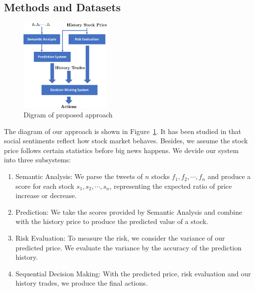 \documentclass[a4paper, 10pt, twocolumn]{article}
\begin{document}
\begin{spacing}{1}
    \section{Methods and Datasets}
    
    \begin{figure}
      \centering
      \includegraphics[width=0.4\textwidth]{diagram}
      \caption{Digram of proposed approach}
      \label{diagram_approach}
    \end{figure}
    
    The diagram of our approach is shown in Figure~\ref{diagram_approach}. It has been studied in \cite{social_relation_sentiment_analysis} that social sentiments reflect how stock market behaves. Besides, we assume the stock price follows certain statistics before big news happens. We devide our system into three subsystems:
    \begin{enumerate}
      \item Semantic Analysis: We parse the tweets of $n$ stocks $f_1, f_2, \cdots, f_n$ and produce a score for each stock $s_1, s_2, \cdots, s_n$, representing the expected ratio of price increase or decrease.
      \item Prediction: We take the scores provided by Semantic Analysis and combine with the history price to produce the predicted value of a stock.
      \item Risk Evaluation: To measure the risk, we consider the variance of our predicted price. We evaluate the variance by the accuracy of the prediction history.
      \item Sequential Decision Making: With the predicted price, risk evaluation and our history trades, we produce the final actions.
    \end{enumerate}
%    
%    
%    
  
  \end{spacing}  
  
  
\end{document}
